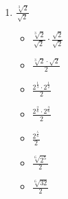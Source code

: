 \documentclass{article}
\begin{document}
\begin{onehalfspace}
\begin{enumerate}[start=59]
        \item $\frac{\sqrt[3]{2}}{\sqrt{2}}$
        \begin{itemize}
            \item $\frac{\sqrt[3]{2}}{\sqrt{2}} \cdot \frac{\sqrt{2}}{\sqrt{2}}$
            \item $\frac{\sqrt[3]{2} \cdot \sqrt{2}}{2}$
            \item $\frac{2^{\frac{1}{3}} \cdot 2^{\frac{1}{2}}}{2}$
            \item $\frac{2^{\frac{2}{6}} \cdot 2^{\frac{3}{6}}}{2}$
            \item $\frac{2^{\frac{5}{6}}}{2}$
            \item $\frac{\sqrt[6]{2^{5}}}{2}$
            \item $\frac{\sqrt[6]{32}}{2}$
        \end{itemize}

     \end{enumerate}
\end{onehalfspace}
\end{document}
